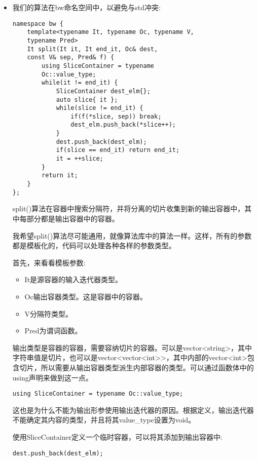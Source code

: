 \begin{itemize}
\item 
我们的算法在bw命名空间中，以避免与std冲突:

\begin{lstlisting}[style=styleCXX]
namespace bw {
	template<typename It, typename Oc, typename V,
	typename Pred>
	It split(It it, It end_it, Oc& dest,
	const V& sep, Pred& f) {
		using SliceContainer = typename
		Oc::value_type;
		while(it != end_it) {
			SliceContainer dest_elm{};
			auto slice{ it };
			while(slice != end_it) {
				if(f(*slice, sep)) break;
				dest_elm.push_back(*slice++);
			}
			dest.push_back(dest_elm);
			if(slice == end_it) return end_it;
			it = ++slice;
		}
		return it;
	}
};
\end{lstlisting}

split()算法在容器中搜索分隔符，并将分离的切片收集到新的输出容器中，其中每部分都是输出容器中的容器。

我希望split()算法尽可能通用，就像算法库中的算法一样。这样，所有的参数都是模板化的，代码可以处理各种各样的参数类型。

首先，来看看模板参数:

\begin{itemize}
\item 
It是源容器的输入迭代器类型。

\item 
Oc输出容器类型。这是容器中的容器。

\item 
V分隔符类型。

\item 
Pred为谓词函数。
\end{itemize}

输出类型是容器的容器，需要容纳切片的容器。可以是vector<string>，其中字符串值是切片，也可以是vector<vector<int>{}>，其中内部的vector<int>包含切片，所以需要从输出容器类型派生内部容器的类型。可以通过函数体中的using声明来做到这一点。

\begin{lstlisting}[style=styleCXX]
using SliceContainer = typename Oc::value_type;
\end{lstlisting}

这也是为什么不能为输出形参使用输出迭代器的原因。根据定义，输出迭代器不能确定其内容的类型，并且将其value\_type设置为void。

使用SliceContainer定义一个临时容器，可以将其添加到输出容器中:

\begin{lstlisting}[style=styleCXX]
dest.push_back(dest_elm);
\end{lstlisting}


\end{itemize}
